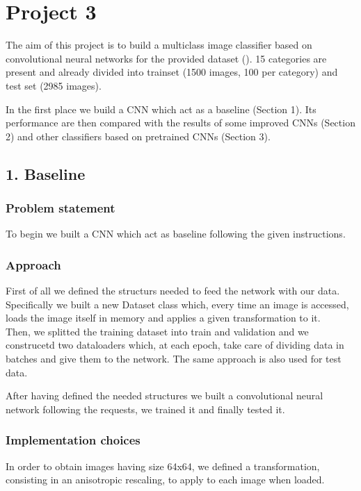 \documentclass[12pt, a4paper]{report}
\begin{document}
\chapter*{Project 3}
		
The aim of this project is to build a multiclass image classifier based on convolutional neural networks for the provided dataset (\cite{Lazebnik et al., 2006}). 15 categories are present and already divided into trainset (1500 images, 100 per category) and test set (2985 images).

In the first place we build a CNN which act as a baseline (Section 1). Its performance are then compared with the results of some improved CNNs (Section 2) and other classifiers based on pretrained CNNs (Section 3).
	
	
\section*{1. Baseline}
\subsection*{Problem statement}

To begin we built a CNN which act as baseline following the given instructions.	

\subsection*{Approach}

First of all we  defined the structurs needed to feed the network with our data.\\
Specifically we built a new Dataset class which, every time an image is accessed, loads the image itself in memory and applies a given transformation to it.\\
Then, we splitted the training dataset into train and validation and we construcetd two dataloaders which, at each epoch, take care of dividing data in batches and give them to the network. The same approach is also used for test data.

After having defined the needed structures we built a convolutional neural network following the requests, we trained it and finally tested it.
	
\subsection*{Implementation choices}

In order to obtain images having size 64x64, we defined a transformation, consisting in an anisotropic rescaling, to apply to each image when loaded.
\end{document}
